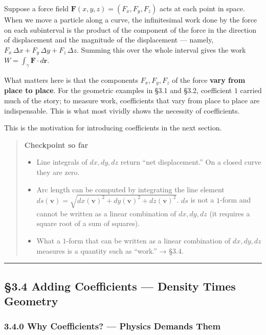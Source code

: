 Suppose a force field \(\mathbf{F}(x,y,z) = (F_x, F_y, F_z)\) acts at
each point in space. When we move a particle along a curve, the
infinitesimal work done by the force on each subinterval is the product
of the component of the force in the direction of displacement and the
magnitude of the displacement --- namely,
\(F_x\,\Delta x + F_y\,\Delta y + F_z\,\Delta z\). Summing this over the
whole interval gives the work
\(W = \int_\gamma \mathbf{F}\cdot d\mathbf{r}\).

What matters here is that the components \(F_x, F_y, F_z\) of the force
\textbf{vary from place to place}. For the geometric examples in §3.1
and §3.2, coefficient \(1\) carried much of the story; to measure work,
coefficients that vary from place to place are indispensable. This is
what most vividly shows the necessity of coefficients.

This is the motivation for introducing coefficients in the next section.

\begin{quote}
\textbf{Checkpoint so far}

\begin{itemize}
\item
  Line integrals of \(dx, dy, dz\) return ``net displacement.'' On a
  closed curve they are zero.
\item
  Arc length can be computed by integrating the line element
  \(ds(\mathbf{v}) = \sqrt{dx(\mathbf{v})^2 + dy(\mathbf{v})^2 + dz(\mathbf{v})^2}\).
  \(ds\) is not a \(1\)-form and cannot be written as a linear
  combination of \(dx, dy, dz\) (it requires a square root of a sum of
  squares).
\item
  What a \(1\)-form that can be written as a linear combination of
  \(dx, dy, dz\) measures is a quantity such as ``work.'' → §3.4.
\end{itemize}
\end{quote}

\begin{center}\rule{0.5\linewidth}{0.5pt}\end{center}

\hypertarget{adding-coefficients-density-times-geometry}{%
\subsection{§3.4 Adding Coefficients --- Density Times
Geometry}\label{adding-coefficients-density-times-geometry}}

\hypertarget{why-coefficients-physics-demands-them}{%
\subsubsection{3.4.0 Why Coefficients? --- Physics Demands
Them}\label{why-coefficients-physics-demands-them}}

